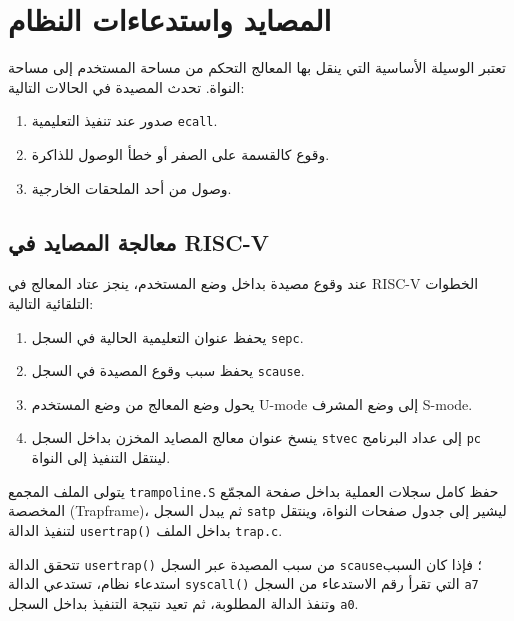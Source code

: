 \chapter{المصايد واستدعاءات النظام}
\label{chap:trap}

تعتبر  الوسيلة الأساسية التي ينقل بها المعالج التحكم من مساحة المستخدم إلى مساحة النواة.
تحدث المصيدة في الحالات التالية:
\begin{enumerate}
\item صدور  عند تنفيذ التعليمية \texttt{ecall}.
\item وقوع  كالقسمة على الصفر أو خطأ الوصول للذاكرة.
\item وصول  من أحد الملحقات الخارجية.
\end{enumerate}

\section{معالجة المصايد في RISC-V}

عند وقوع مصيدة بداخل وضع المستخدم، ينجز عتاد المعالج في RISC-V الخطوات التلقائية التالية:
\begin{enumerate}
\item يحفظ عنوان التعليمية الحالية في السجل \texttt{sepc}.
\item يحفظ سبب وقوع المصيدة في السجل \texttt{scause}.
\item يحول وضع المعالج من وضع المستخدم U-mode إلى وضع المشرف S-mode.
\item ينسخ عنوان معالج المصايد المخزن بداخل السجل \texttt{stvec} إلى عداد البرنامج \texttt{pc} لينتقل التنفيذ إلى النواة.
\end{enumerate}

يتولى الملف المجمع \texttt{trampoline.S} حفظ كامل سجلات العملية بداخل صفحة المجمّع المخصصة (Trapframe)،
ثم يبدل السجل \texttt{satp} ليشير إلى جدول صفحات النواة، وينتقل لتنفيذ الدالة \texttt{usertrap()} بداخل الملف \texttt{trap.c}.

تتحقق الدالة \texttt{usertrap()} من سبب المصيدة عبر السجل \texttt{scause}؛
فإذا كان السبب استدعاء نظام، تستدعي الدالة \texttt{syscall()} التي تقرأ رقم الاستدعاء من السجل \texttt{a7} وتنفذ الدالة المطلوبة،
ثم تعيد نتيجة التنفيذ بداخل السجل \texttt{a0}.
